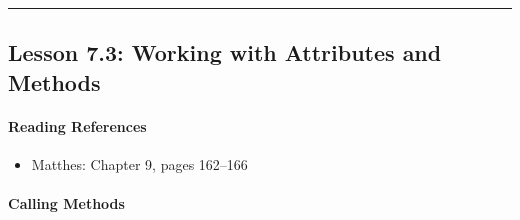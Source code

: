 \documentclass[
  justified,
  openright,
]{tufte-book}
\let\subsubsection\paragraph
\let\paragraph\paragraph
\let\subsubsection\paragraph
\let\paragraph\paragraph
\providecommand{\tightlist}{%
  \setlength{\itemsep}{0pt}\setlength{\parskip}{0pt}}
\begin{document}
\begin{center}\rule{0.5\linewidth}{0.5pt}\end{center}

\subsection{Lesson 7.3: Working with Attributes and
Methods}\label{lesson-7.3-working-with-attributes-and-methods}

\subsubsection{Reading References}\label{reading-references-21}

\begin{itemize}
\tightlist
\item
  Matthes: Chapter 9, pages 162--166
\end{itemize}

\subsubsection{Calling Methods}\label{calling-methods}
\end{document}
